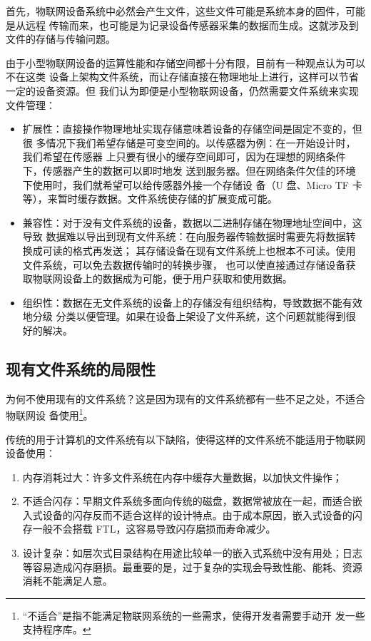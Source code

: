 \documentclass{ctexart}
\begin{document}
首先，物联网设备系统中必然会产生文件，这些文件可能是系统本身的固件，可能是从远程
传输而来，也可能是为记录设备传感器采集的数据而生成。这就涉及到文件的存储与传输问题。

由于小型物联网设备的运算性能和存储空间都十分有限，目前有一种观点认为可以不在这类
设备上架构文件系统，而让存储直接在物理地址上进行，这样可以节省一定的设备资源。但
我们认为即便是小型物联网设备，仍然需要文件系统来实现文件管理：
\begin{itemize}
\item 扩展性：直接操作物理地址实现存储意味着设备的存储空间是固定不变的，但很
 多情况下我们希望存储是可变空间的。以传感器为例：在一开始设计时，我们希望在传感器
 上只要有很小的缓存空间即可，因为在理想的网络条件下，传感器产生的数据可以即时地发
 送到服务器。但在网络条件欠佳的环境下使用时，我们就希望可以给传感器外接一个存储设 
 备（U 盘、Micro TF 卡等），来暂时缓存数据。文件系统使存储的扩展变成可能。
\item 兼容性：对于没有文件系统的设备，数据以二进制存储在物理地址空间中，这导致
 数据难以导出到现有文件系统：在向服务器传输数据时需要先将数据转换成可读的格式再发送；
 其存储设备在现有文件系统上也根本不可读。使用文件系统，可以免去数据传输时的转换步骤，
 也可以使直接通过存储设备获取物联网设备上的数据成为可能，便于用户获取和使用数据。
\item 组织性：数据在无文件系统的设备上的存储没有组织结构，导致数据不能有效地分级
 分类以便管理。如果在设备上架设了文件系统，这个问题就能得到很好的解决。
\end{itemize}

\subsection{现有文件系统的局限性}

为何不使用现有的文件系统？这是因为现有的文件系统都有一些不足之处，不适合物联网设
备使用\footnote{“不适合”是指不能满足物联网系统的一些需求，使得开发者需要手动开
  发一些支持程序库。}。

传统的用于计算机的文件系统有以下缺陷，使得这样的文件系统不能适用于物联网设备使用：
\begin{enumerate}
	\item 内存消耗过大：许多文件系统在内存中缓存大量数据，以加快文件操作；
	\item 不适合闪存：早期文件系统多面向传统的磁盘，数据常被放在一起，而适合嵌入式设备的闪存反而不适合这样的设计特点。由于成本原因，嵌入式设备的闪存一般不会搭载 FTL，这容易导致闪存磨损而寿命减少。
	\item 设计复杂：如层次式目录结构在用途比较单一的嵌入式系统中没有用处；日志等容易造成闪存磨损。最重要的是，过于复杂的实现会导致性能、能耗、资源消耗不能满足人意。
\end{enumerate}
\end{document}
